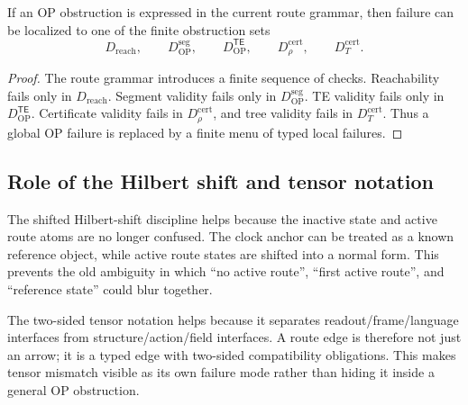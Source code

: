 \begin{proposition}
\label{prop:v410r17-factorization-narrows-failure}
If an OP obstruction is expressed in the current route grammar, then failure can
be localized to one of the finite obstruction sets
\[
 D_{\mathrm{reach}},
 \qquad
 D_{\mathrm{OP}}^{\mathrm{seg}},
 \qquad
 D_{\mathrm{OP}}^{\mathsf{TE}},
 \qquad
 D_{\rho}^{\mathrm{cert}},
 \qquad
 D_T^{\mathrm{cert}}.
\]
\end{proposition}

\begin{proof}
The route grammar introduces a finite sequence of checks. Reachability fails
only in \(D_{\mathrm{reach}}\). Segment validity fails only in
\(D_{\mathrm{OP}}^{\mathrm{seg}}\). TE validity fails only in
\(D_{\mathrm{OP}}^{\mathsf{TE}}\). Certificate validity fails in
\(D_{\rho}^{\mathrm{cert}}\), and tree validity fails in
\(D_T^{\mathrm{cert}}\). Thus a global OP failure is replaced by a finite
menu of typed local failures.
\end{proof}

\subsection{Role of the Hilbert shift and tensor notation}
\label{subsec:v410r17-role-hilbert-shift-tensor-notation}

\begin{remark}
\label{rem:v410r17-reserved-zero-clock-anchoring}
The shifted Hilbert-shift discipline helps because the inactive state and active
route atoms are no longer confused. The clock anchor can be treated as a known
reference object, while active route states are shifted into a normal form.
This prevents the old ambiguity in which ``no active route'', ``first active
route'', and ``reference state'' could blur together.
\end{remark}

\begin{remark}
\label{rem:v410r17-two-sided-tensor-notation}
The two-sided tensor notation helps because it separates readout/frame/language
interfaces from structure/action/field interfaces. A route edge is therefore
not just an arrow; it is a typed edge with two-sided compatibility obligations.
This makes tensor mismatch visible as its own failure mode rather than hiding it
inside a general OP obstruction.
\end{remark}

